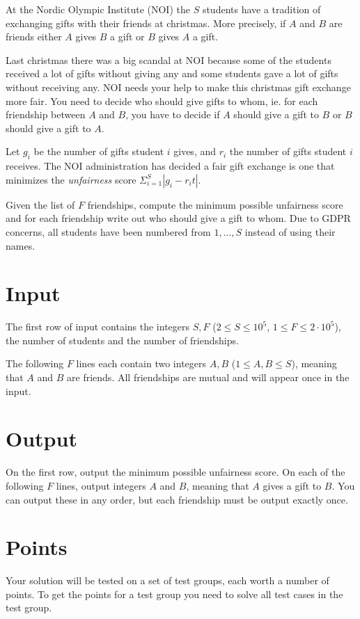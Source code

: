 \def\version{1}

At the Nordic Olympic Institute (NOI) the $S$ students have a tradition of exchanging gifts with
their friends at christmas. More precisely, if $A$ and $B$ are friends either $A$ gives $B$ a gift or
$B$ gives $A$ a gift.

Last christmas there was a big scandal at NOI because some of the students received a lot
of gifts without giving any and some students gave a lot of gifts without receiving any. NOI
needs your help to make this christmas gift exchange more fair. You need to decide who
should give gifts to whom, ie. for each friendship between $A$ and $B$, you have to decide if $A$
should give a gift to $B$ or $B$ should give a gift to $A$.

Let $g_i$ be the number of gifts student $i$ gives, and $r_i$ the number of gifts student $i$ receives.
The NOI administration has decided a fair gift exchange is one that minimizes the \textit{unfairness}
score $\Sigma_{i=1}^{S} |g_i-r_it|$.

Given the list of $F$ friendships, compute the minimum possible unfairness score and for each
friendship write out who should give a gift to whom. Due to GDPR concerns, all students
have been numbered from $1,\ldots,S$ instead of using their names.

\section*{Input}
\noindent
The first row of input contains the integers $S, F$ ($2 \leq S \leq 10^5$, $1 \leq F \leq 2 \cdot 10^5$), the number
of students and the number of friendships.

The following $F$ lines each contain two integers $A, B$ ($1 \leq A, B \leq S$), meaning that $A$ and $B$ are friends.
All friendships are mutual and will appear once in the input.

\section*{Output}
\noindent
On the first row, output the minimum possible unfairness score.
On each of the following $F$ lines, output integers $A$ and $B$, meaning that $A$ gives a gift to $B$.
You can output these in any order, but each friendship must be output exactly once.

\section*{Points}
\noindent
Your solution will be tested on a set of test groups, each worth a number of points.
To get the points for a test group you need to solve all test cases in the test group.

